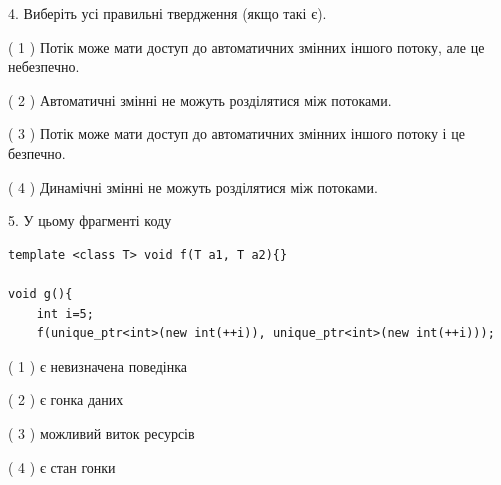 \documentclass[12pt, ukrainian]{article}
\begin{document}
\begin {large}
{%
4. Виберіть усі правильні твердження (якщо такі є).\par
\vspace{2mm}

( 1 ) Потік може мати доступ до автоматичних змінних іншого потоку, але це небезпечно.%

( 2 ) Автоматичні змінні не можуть розділятися між потоками.%

( 3 ) Потік може мати доступ до автоматичних змінних іншого потоку і це безпечно.%

( 4 ) Динамічні змінні не можуть розділятися між потоками.%


5. У цьому фрагменті коду
\begin{verbatim}
template <class T> void f(T a1, T a2){}

void g(){
    int i=5;
    f(unique_ptr<int>(new int(++i)), unique_ptr<int>(new int(++i)));
\end{verbatim}

( 1 ) є невизначена поведінка%

( 2 ) є гонка даних%

( 3 ) можливий виток ресурсів%

( 4 ) є стан гонки%
}
\end {large}
\end{document}
